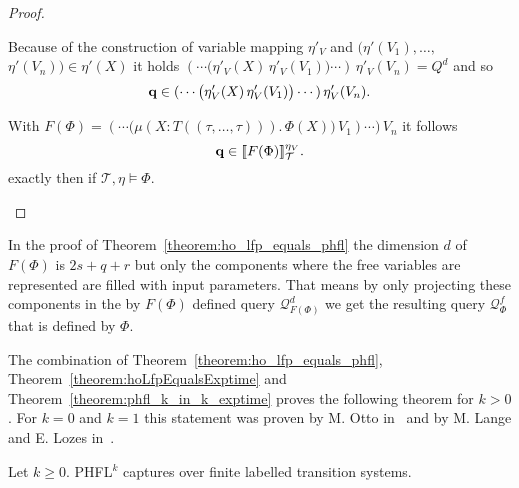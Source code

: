 \begin{proof}
\begin{compactitem}
                Because of the construction of variable mapping $\eta'_V$ and $(\eta'(V_1), \dots, $ $\eta'(V_n)) \in \eta'(X)$ it holds
        $(\dotsb\big(\eta'_V(X)\,\eta'_V(V_1)\big) \dotsb )\,\eta'_V(V_n) = Q^d$
        and so 
        \begin{align*}
        \emph{q} \in (\dotsb \big(\eta'_V(X)\,\eta'_V(V_1)\big) \dotsb )\,\eta'_V(V_n).
        \end{align*}    

        With $F(\Phi) = (\dotsb \big(\mu (X \colon T((\tau, \dots, \tau))).\,\Phi(X)\big)\,V_1)\dotsb)\,V_n$ it follows
        \[\emph{q} \in \llbracket
         F(\Phi) \rrbracket^{\eta_V}_\mathcal{T}.\]
        exactly then if $\mathcal{T}, \eta \models \Phi$.
    \end{compactitem}
\end{proof}

\begin{remark}
In the proof of Theorem~\ref{theorem:ho_lfp_equals_phfl} the dimension $d$ of $F(\Phi)$ is $2s+q+r$ but only the components where the free variables are represented are filled with input parameters. That means by only projecting these components in the by $F(\Phi)$ defined query $\mathcal{Q}^d_{F(\Phi)}$ we get the resulting query $\mathcal{Q}^f_{\Phi}$ that is defined by $\Phi$. 
\end{remark}

The combination of Theorem~\ref{theorem:ho_lfp_equals_phfl}, Theorem~\ref{theorem:hoLfpEqualsExptime} and 
Theorem~\ref{theorem:phfl_k_in_k_exptime} proves the following theorem for $k>0$. For $k = 0$ and $k = 1$ this statement was proven by M. Otto in~\cite{otto1999bisimulation} and by M. Lange and E. Lozes in~\cite{lange2014capturing}.

\begin{theorem}
    Let $k \geq 0$. PHFL$^k$ captures  over finite labelled transition systems.
\end{theorem}

